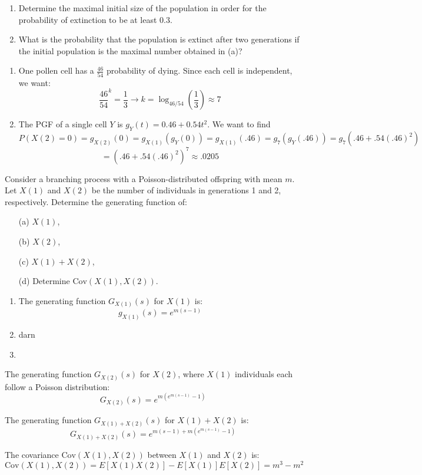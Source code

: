 \begin{enumerate}[label=(\alph*)]
\begin{enumerate}
    \item Determine the maximal initial size of the population in order for the probability of extinction to be at least 0.3.
    \item What is the probability that the population is extinct after two generations if the initial population is the maximal number obtained in (a)?
\end{enumerate}

\solution
\begin{enumerate}
    \item One pollen cell has a $\frac{46}{54}$ probability of dying. Since each cell is independent, we want:
     \[
        \frac{46}{54}^k = \frac{1}{3} \rightarrow k = \log_{46/54}(\frac{1}{3}) \approx 7
    \]
    \item The PGF of a single cell $Y$ is $g_Y(t)=0.46+0.54t^2$. We want to find \[
        P(X(2) = 0)= g_{X(2)}(0) = g_{X(1)}(g_Y(0)) = g_{X(1)}(.46) = g_{7}(g_Y(.46)) = g_7(.46+.54(.46)^2)
        \]
        \[
            =
            (.46+.54(.46)^2)^7 \approx .0205    
        \]
\end{enumerate}

\setcounter{problem}{42}

\problem Consider a branching process with a Poisson-distributed offspring with mean \( m \). Let \( X(1) \) and \( X(2) \) be the number of individuals in generations 1 and 2, respectively. Determine the generating function of:
\begin{itemize}
    \item[(a)] \( X(1) \),
    \item[(b)] \( X(2) \),
    \item[(c)] \( X(1) + X(2) \),
    \item[(d)] Determine \( \text{Cov}(X(1), X(2)) \).
\end{itemize}

\solution
\begin{enumerate}
    \item The generating function \( G_{X(1)}(s) \) for \( X(1) \) is:
    \[ g_{X(1)}(s) = e^{m(s-1)} \]

    \item darn
    \item 
\end{enumerate}

The generating function \( G_{X(2)}(s) \) for \( X(2) \), where \( X(1) \) individuals each follow a Poisson distribution:
\[ G_{X(2)}(s) = e^{m(e^{m(s-1)}-1)} \]

The generating function \( G_{X(1) + X(2)}(s) \) for \( X(1) + X(2) \) is:
\[ G_{X(1)+X(2)}(s) = e^{m(s-1) + m(e^{m(s-1)}-1)} \]

The covariance \( \text{Cov}(X(1), X(2)) \) between \( X(1) \) and \( X(2) \) is:
\[ \text{Cov}(X(1), X(2)) = E[X(1)X(2)] - E[X(1)]E[X(2)] = m^3 - m^2 \]
\end{enumerate}


